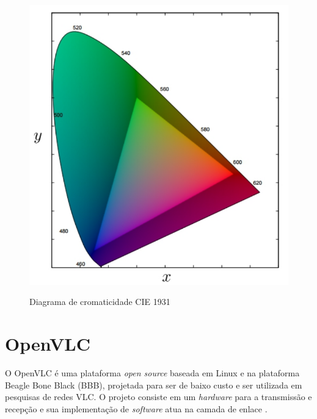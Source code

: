 \begin{figure}[!htbp]
  \caption{Diagrama de cromaticidade CIE 1931}
  \includegraphics[scale=0.4]{images/csk.png}
  \label{fig:}
\end{figure}


\section{OpenVLC}

O OpenVLC é uma plataforma \textit{open source} baseada em  Linux e na plataforma Beagle Bone Black (BBB), projetada para ser de baixo custo e ser utilizada em pesquisas de redes VLC. O projeto consiste em um \textit{hardware} para a transmissão e recepção e sua implementação de \textit{software} atua na camada de enlace \cite{OpenVLCB}.


